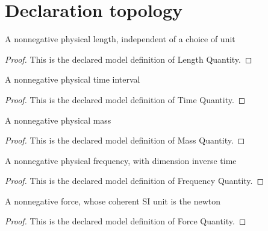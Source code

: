 \section{Declaration topology}
\begin{definition}
  \label{def:physics:phyx-mini-0611:phyxminiproblems-problemphyxmini0611-lengthquantity}
  A nonnegative physical length, independent of a choice of unit
\end{definition}
\begin{proof}
  This is the declared model definition of Length Quantity.
\end{proof}
\begin{definition}
  \label{def:physics:phyx-mini-0611:phyxminiproblems-problemphyxmini0611-timequantity}
  A nonnegative physical time interval
\end{definition}
\begin{proof}
  This is the declared model definition of Time Quantity.
\end{proof}
\begin{definition}
  \label{def:physics:phyx-mini-0611:phyxminiproblems-problemphyxmini0611-massquantity}
  A nonnegative physical mass
\end{definition}
\begin{proof}
  This is the declared model definition of Mass Quantity.
\end{proof}
\begin{definition}
  \label{def:physics:phyx-mini-0611:phyxminiproblems-problemphyxmini0611-frequencyquantity}
  A nonnegative physical frequency, with dimension inverse time
\end{definition}
\begin{proof}
  This is the declared model definition of Frequency Quantity.
\end{proof}
\begin{definition}
  \label{def:physics:phyx-mini-0611:phyxminiproblems-problemphyxmini0611-forcequantity}
  A nonnegative force, whose coherent SI unit is the newton
\end{definition}
\begin{proof}
  This is the declared model definition of Force Quantity.
\end{proof}
